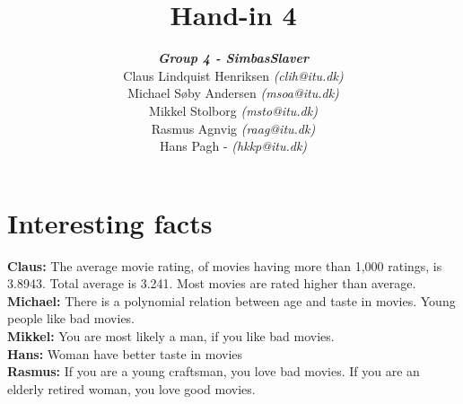 \documentclass[a4paper,11pt]{article}
\title{Hand-in 4}
\author{\textbf{\textit{Group 4 - SimbasSlaver}}\\
  Claus Lindquist Henriksen \textit{(clih@itu.dk)}\\
  Michael Søby Andersen \textit{(msoa@itu.dk)}\\
  Mikkel Stolborg \textit{(msto@itu.dk)}\\
  Rasmus Agnvig \textit{(raag@itu.dk)}\\
  Hans Pagh - \textit{(hkkp@itu.dk)}
}
\begin{document}
\maketitle
\newpage
\tableofcontents
\newpage
\section{Interesting facts}
\textbf{Claus: }The average movie rating, of movies having more than 1,000
ratings, is 3.8943. Total average is 3.241. Most movies are rated higher than
average.\\
\textbf{Michael: }There is a polynomial relation between age and taste in
movies. Young people like bad movies.\\
\textbf{Mikkel: }You are most likely a man, if you like bad movies.\\
\textbf{Hans: }Woman have better taste in movies\\
\textbf{Rasmus: }If you are a young craftsman, you love bad movies. If you are
an elderly retired woman, you love good movies.\\
\newpage




\end{document}
